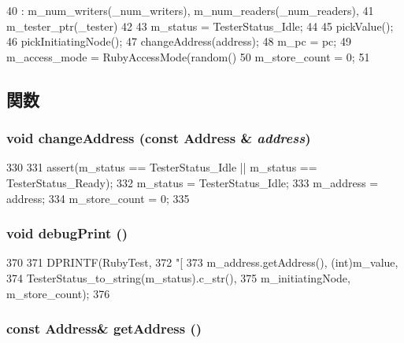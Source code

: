 \begin{DoxyCode}
40     : m_num_writers(_num_writers), m_num_readers(_num_readers),
41       m_tester_ptr(_tester)
42 {
43     m_status = TesterStatus_Idle;
44 
45     pickValue();
46     pickInitiatingNode();
47     changeAddress(address);
48     m_pc = pc;
49     m_access_mode = RubyAccessMode(random() %
50     m_store_count = 0;
51 }
\end{DoxyCode}


\subsection{関数}
\hypertarget{classCheck_a3df4c3e039cf1557a32bd9b7ff9a84e4}{
\subsubsection[{changeAddress}]{\setlength{\rightskip}{0pt plus 5cm}void changeAddress (const {\bf Address} \& {\em address})}}
\label{classCheck_a3df4c3e039cf1557a32bd9b7ff9a84e4}



\begin{DoxyCode}
330 {
331     assert(m_status == TesterStatus_Idle || m_status == TesterStatus_Ready);
332     m_status = TesterStatus_Idle;
333     m_address = address;
334     m_store_count = 0;
335 }
\end{DoxyCode}
\hypertarget{classCheck_a653b559db67502e3171dca8f39cd7783}{
\subsubsection[{debugPrint}]{\setlength{\rightskip}{0pt plus 5cm}void debugPrint ()}}
\label{classCheck_a653b559db67502e3171dca8f39cd7783}



\begin{DoxyCode}
370 {
371     DPRINTF(RubyTest,
372         "[%
373         m_address.getAddress(), (int)m_value,
374         TesterStatus_to_string(m_status).c_str(),
375         m_initiatingNode, m_store_count);
376 }
\end{DoxyCode}
\hypertarget{classCheck_adae095cd74f47f3f24ee267e18e87810}{
\subsubsection[{getAddress}]{\setlength{\rightskip}{0pt plus 5cm}const {\bf Address}\& getAddress ()}}
\label{classCheck_adae095cd74f47f3f24ee267e18e87810}



